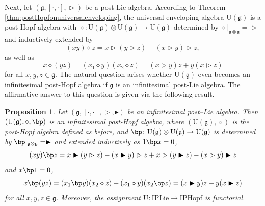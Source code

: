 \documentclass[10pt]{article}
\newtheorem {proposition} [lemma] {Proposition}
\theoremstyle{definition}
\newcommand{\wt}{\vartriangleright}
\newcommand{\bt}{\blacktriangleright}
\renewcommand{\wp}{\diamond}
\begin{document}
Next, let $(\mathfrak{g},[\cdot,\cdot],\wt)$ be a post-Lie algebra. According to Theorem \ref{thm:postHopfonuniversalenveloping}, the universal enveloping algebra $\mathrm{U}(\mathfrak{g})$ is a post-Hopf algebra with $\wp\colon \mathrm{U}(\mathfrak{g})\otimes \mathrm{U}(\mathfrak{g})\to \mathrm{U}(\mathfrak{g})$ determined by $\wp|_{\mathfrak{g}\otimes\mathfrak{g}}=\wt$ and inductively extended by
\[
(xy)\wp z=x\wt (y\wt z)-(x\wt y)\wt z,
\]
as well as 
\[
x\wp(yz)=(x_1\wp y)(x_2\wp z)=(x\wt y)z+y(x\wt z)
\]
for all $x,y,z\in\mathfrak{g}$. The natural question arises whether $\mathrm{U}(\mathfrak{g})$ even becomes an infinitesimal post-Hopf algebra if $\mathfrak{g}$ is an infinitesimal post-Lie algebra. The affirmative answer to this question is given via the following result.

\begin{proposition}\label{thm:universal}
Let $(\mathfrak{g},[\cdot,\cdot],\wt,\bt)$ be an infinitesimal post--Lie algebra. Then $(\mathrm{U}(\mathfrak{g}),\wp,\bp)$ is an infinitesimal post-Hopf algebra, where $(\mathrm{U}(\mathfrak{g}),\wp)$ is the post-Hopf algebra defined as before, and $\bp\colon \mathrm{U}(\mathfrak{g})\otimes \mathrm{U}(\mathfrak{g})\to \mathrm{U}(\mathfrak{g})$ is determined by $\bp|_{\mathfrak{g}\otimes\mathfrak{g}}=\bt$ and extended inductively as $1\bp x=0$,
\begin{equation}\label{rhdext1}
    (xy)\bp z
    =x\bt(y\wt z)-(x\bt y)\wt z
    +x\wt(y\bt z)-(x\wt y)\bt z
\end{equation}
and $x \bp1=0$,
\begin{equation}\label{rhdext2}
    x \bp(yz)
    =(x_1 \bp y)(x_2\wp z)
    +(x_1\wp y)(x_2 \bp z)
    =(x\bt y)z+y(x\bt z)
\end{equation}
for all $x,y,z\in\mathfrak{g}$. Moreover, the assignment $\mathrm{U}:\mathrm{IPLie}\to\mathrm{IPHopf}$ is functorial.
\end{proposition}
\end{document}

